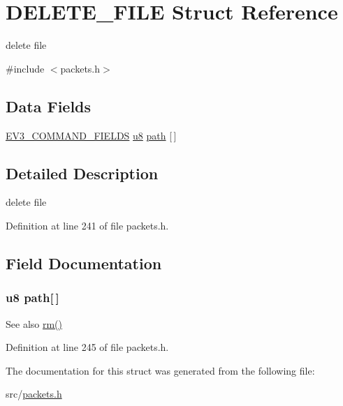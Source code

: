 \hypertarget{struct_d_e_l_e_t_e___f_i_l_e}{}\section{D\+E\+L\+E\+T\+E\+\_\+\+F\+I\+L\+E Struct Reference}
\label{struct_d_e_l_e_t_e___f_i_l_e}


delete file  




{\ttfamily \#include $<$packets.\+h$>$}

\subsection*{Data Fields}
\begin{DoxyCompactItemize}
\item 
\hyperlink{packets_8h_a0c26a010ef0da2962a751796943824c9}{E\+V3\+\_\+\+C\+O\+M\+M\+A\+N\+D\+\_\+\+F\+I\+E\+L\+D\+S} \hyperlink{defs_8h_a92c50087ca0e64fa93fc59402c55f8ca}{u8} \hyperlink{struct_d_e_l_e_t_e___f_i_l_e_a56e505ffa12d1226ba348960c4678d7f}{path} \mbox{[}$\,$\mbox{]}
\end{DoxyCompactItemize}


\subsection{Detailed Description}
delete file 

Definition at line 241 of file packets.\+h.



\subsection{Field Documentation}
\hypertarget{struct_d_e_l_e_t_e___f_i_l_e_a56e505ffa12d1226ba348960c4678d7f}{}
\subsubsection[{path}]{ {\bf u8} path\mbox{[}$\,$\mbox{]}}\label{struct_d_e_l_e_t_e___f_i_l_e_a56e505ffa12d1226ba348960c4678d7f}
\begin{DoxySeeAlso}{See also}
\hyperlink{funcs_8h_ae815743b20ac09451a0c027c8ad6b57e}{rm()} 
\end{DoxySeeAlso}


Definition at line 245 of file packets.\+h.



The documentation for this struct was generated from the following file\+:\begin{DoxyCompactItemize}
\item 
src/\hyperlink{packets_8h}{packets.\+h}\end{DoxyCompactItemize}
